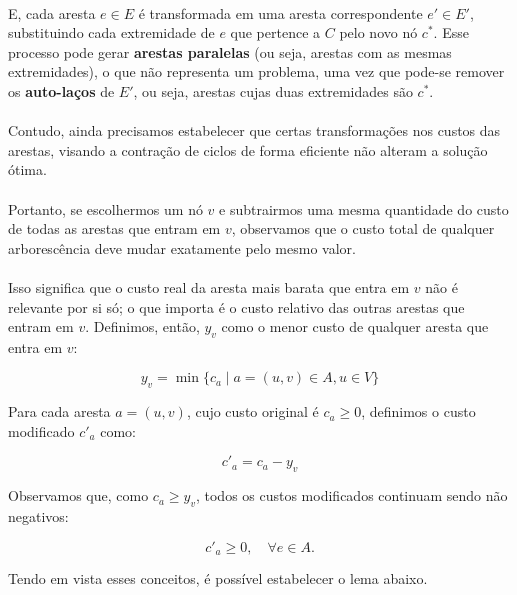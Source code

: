 \documentclass[12pt,a4paper]{article}
\begin{document}
\paragraph{}
E, cada aresta \( e \in E \)  é transformada em uma aresta correspondente \( e' \in E' \), substituindo cada extremidade de \( e \) que pertence a \( C \) pelo novo nó \( c^* \). Esse processo pode gerar \textbf{arestas paralelas} (ou seja, arestas com as mesmas extremidades), o que não representa um problema, uma vez que pode-se remover os \textbf{auto-laços} de \( E' \), ou seja, arestas cujas duas extremidades são \( c^* \).

\paragraph{}
Contudo, ainda precisamos estabelecer que certas transformações nos custos das arestas, visando a contração de ciclos de forma eficiente não alteram a solução ótima. 

\paragraph{}
Portanto, se escolhermos um nó \( v \) e subtrairmos uma mesma quantidade do custo de todas as arestas que entram em \( v \), observamos que o custo total de qualquer arborescência deve mudar exatamente pelo mesmo valor.

\paragraph{}
Isso significa que o custo real da aresta mais barata que entra em \( v \) não é relevante por si só; o que importa é o custo relativo das outras arestas que entram em \( v \). Definimos, então, \( y_v \) como o menor custo de qualquer aresta que entra em \( v \):

\[
y_v = \min \{ c_a \mid a = (u, v) \in A, u \in V \}
\]

Para cada aresta \( a = (u, v) \), cujo custo original é \( c_a \geq 0 \), definimos o custo modificado \( c'_a \) como:

\[
c'_a = c_a - y_v
\]

Observamos que, como \( c_a \geq y_v \), todos os custos modificados continuam sendo não negativos:

\[
c'_a \geq 0, \quad \forall e \in A.
\]

Tendo em vista esses conceitos, é possível estabelecer o lema abaixo.
\end{document}
